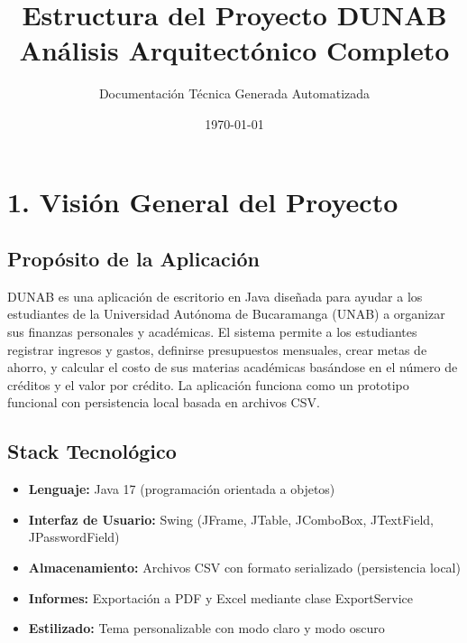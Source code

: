 \documentclass[utf8]{article}
\title{Estructura del Proyecto DUNAB \\ Análisis Arquitectónico Completo}
\author{Documentación Técnica Generada Automatizada}
\date{\today}
\begin{document}
\maketitle

\section*{1. Visión General del Proyecto}

\subsection*{Propósito de la Aplicación}
DUNAB es una aplicación de escritorio en Java diseñada para ayudar a los estudiantes de la Universidad Autónoma de Bucaramanga (UNAB) a organizar sus finanzas personales y académicas. El sistema permite a los estudiantes registrar ingresos y gastos, definirse presupuestos mensuales, crear metas de ahorro, y calcular el costo de sus materias académicas basándose en el número de créditos y el valor por crédito. La aplicación funciona como un prototipo funcional con persistencia local basada en archivos CSV.

\subsection*{Stack Tecnológico}
\begin{itemize}[leftmargin=*]
    \item \textbf{Lenguaje:} Java 17 (programación orientada a objetos)
    \item \textbf{Interfaz de Usuario:} Swing (JFrame, JTable, JComboBox, JTextField, JPasswordField)
    \item \textbf{Almacenamiento:} Archivos CSV con formato serializado (persistencia local)
    \item \textbf{Informes:} Exportación a PDF y Excel mediante clase ExportService
    \item \textbf{Estilizado:} Tema personalizable con modo claro y modo oscuro
\end{itemize}
\end{document}
